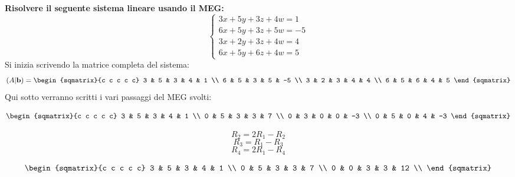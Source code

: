 \begin{esempio}
    \textbf{Risolvere il seguente sistema lineare usando il MEG:}
    \[
        \begin{cases}
            3x + 5y + 3z + 4w = 1 \\
            6x + 5y + 3z + 5w = -5 \\
            3x + 2y + 3z + 4w = 4 \\
            6x + 5y + 6z + 4w = 5
        \end{cases}
    \]
    Si inizia scrivendo la matrice completa del sistema:
    \[
        (A|\textbf{b}) =
        \begin{sqmatrix}{c c c c c}
            3 & 5 & 3 & 4 & 1 \\
            6 & 5 & 3 & 5 & -5 \\
            3 & 2 & 3 & 4 & 4 \\
            6 & 5 & 6 & 4 & 5
        \end{sqmatrix}
    \]
    Qui sotto verranno scritti i vari passaggi del MEG svolti:
    \begin{center}
        \begin{minipage}{.4\textwidth}
            \[
                \begin{sqmatrix}{c c c c c}
                    3 & 5 & 3 & 4 & 1 \\
                    0 & 5 & 3 & 3 & 7 \\
                    0 & 3 & 0 & 0 & -3 \\
                    0 & 5 & 0 & 4 & -3
                \end{sqmatrix}
            \]
        \end{minipage}
        \begin{minipage}{.4\textwidth}
            \[
                R_2 = 2R_1 - R_2
            \]
            \[
                R_3 = R_1 - R_3
            \]
            \[
                R_4 = 2R_1 - R_4
            \]
        \end{minipage}
    \end{center}
    \begin{center}
        \begin{minipage}{.4\textwidth}
            \[
                \begin{sqmatrix}{c c c c c}
                    3 & 5 & 3 & 4 & 1 \\
                    0 & 5 & 3 & 3 & 7 \\
                    0 & 0 & 3 & 3 & 12 \\

\end{sqmatrix}\]
\end{minipage}
\end{center}
\end{esempio}
